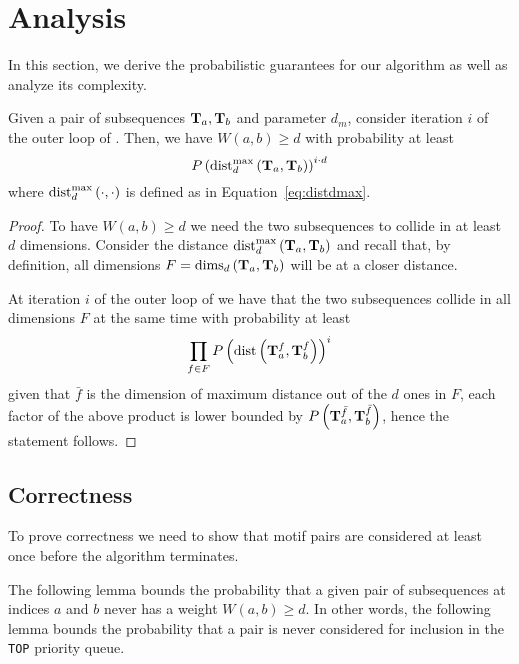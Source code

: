 \section{Analysis}
\label{sec:complexity}
In this section, we derive the probabilistic guarantees for our algorithm as well as analyze its complexity.



\begin{lemma}\label{lem:collision-probability}
Given a pair of subsequences $\mathbf{T}_{a}, \mathbf{T}_{b}$ and parameter $d_m$,
consider iteration
$i$ of the outer loop of .
Then, we have $W(a, b) \ge d$ with probability at least
\begin{equation}
    P\left(\operatorname{dist}^{\max}_{d}\left(\mathbf{T}_{a}, \mathbf{T}_{b}\right)\right)^{i \cdot d}
\end{equation}
where $\operatorname{dist}^{\max}_{d}\left(\cdot,\cdot\right)$ is defined as in Equation~\eqref{eq:distdmax}.
\end{lemma}
\begin{proof}
    To have $W(a,b) \ge d$ we need the two subsequences to collide in at least $d$ dimensions.
    \newline
    Consider the distance $\operatorname{dist}^{\max}_{d}\left(\mathbf{T}_{a}, \mathbf{T}_{b}\right)$ and recall that, by definition, all dimensions
    $F=\operatorname{dims}_{d}\left(\mathbf{T}_{a}, \mathbf{T}_{b}\right)$ will be at a closer distance.

    At iteration $i$ of the outer loop of  we have that the two subsequences collide in all dimensions $F$ at the same time with probability at least
    \[
    \prod_{f\in F} P\left(\operatorname{dist}\left(\mathbf{T}_{a}^{f}, \mathbf{T}_{b}^{f}\right)\right)^i
    \]
    given that $\bar{f}$ is the dimension of maximum distance out of the $d$ ones in $F$, each
    factor of the above product is lower bounded by 
    $P\left(\mathbf{T}_{a}^{\bar{f}},\mathbf{T}_{b}^{\bar{f}}\right)$,
    hence the statement follows.
\end{proof}



\subsection{Correctness}

To prove correctness we need to show that motif pairs are considered at least once before the algorithm terminates.

The following lemma bounds the probability that a given pair of subsequences at indices $a$ and $b$
never has a weight $W(a,b) \ge d$. In other words, the following lemma bounds the probability that a pair is never considered for inclusion in the \texttt{TOP} priority queue.

